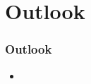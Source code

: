 \section{Outlook}

\begin{frame}
	\frametitle{Outlook}
	\begin{itemize}
		\item 
	\end{itemize}
\end{frame}
